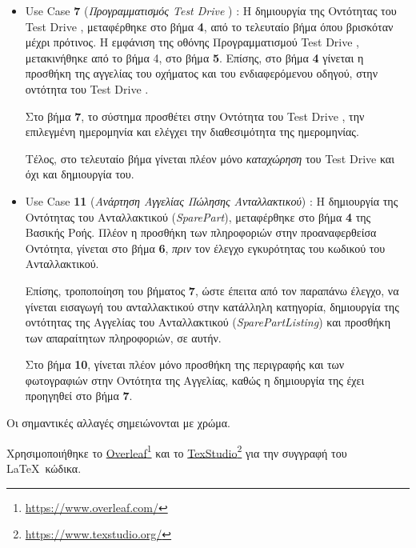 \documentclass{../ol-softwaremanual}
\newcommand{\doclink}[2]{\href{#1}{#2}\footnote{\url{#1}}}
\begin{document}
\begin{itemize}
		\item \en Use Case \textbf{7} \gr (\textit{Προγραμματισμός \en Test Drive \gr}) : Η δημιουργία της Οντότητας του \en Test Drive \gr, μεταφέρθηκε στο βήμα \textbf{4}, από το τελευταίο βήμα όπου βρισκόταν μέχρι πρότινος. Η εμφάνιση της οθόνης Προγραμματισμού \en Test Drive \gr, μετακινήθηκε από το βήμα 4, στο βήμα \textbf{5}. Επίσης, στο βήμα \textbf{4} γίνεται η προσθήκη της αγγελίας του οχήματος και του ενδιαφερόμενου οδηγού, στην οντότητα του \en Test Drive \gr.
		
		Στο βήμα \textbf{7}, το σύστημα προσθέτει στην Οντότητα του \en Test Drive \gr, την επιλεγμένη ημερομηνία και ελέγχει την διαθεσιμότητα της ημερομηνίας.
		
		Τέλος, στο τελευταίο βήμα γίνεται πλέον μόνο \textit{καταχώρηση} του \en Test Drive \gr και όχι και δημιουργία του.
		
		
		\item \en Use Case \textbf{11} \gr (\textit{Ανάρτηση Αγγελίας Πώλησης Ανταλλακτικού}) : Η δημιουργία της Οντότητας του Ανταλλακτικού (\en \textit{SparePart}\gr), μεταφέρθηκε στο βήμα \textbf{4} της Βασικής Ροής. Πλέον η προσθήκη των πληροφοριών στην προαναφερθείσα Οντότητα, γίνεται στο βήμα \textbf{6}, \textit{πριν} τον έλεγχο εγκυρότητας του κωδικού του Ανταλλακτικού.
		
		Επίσης, τροποποίηση του βήματος \textbf{7}, ώστε έπειτα από τον παραπάνω έλεγχο, να γίνεται εισαγωγή του ανταλλακτικού στην κατάλληλη κατηγορία, δημιουργία της οντότητας της Αγγελίας του Ανταλλακτικού (\en \textit{SparePartListing}\gr) και προσθήκη των απαραίτητων πληροφοριών, σε αυτήν.
		
		Στο βήμα \textbf{10}, γίνεται πλέον μόνο προσθήκη της περιγραφής και των φωτογραφιών στην Οντότητα της Αγγελίας, καθώς η δημιουργία της έχει προηγηθεί στο βήμα \textbf{7}.
		
	\end{itemize}
	
	
	\vspace{20pt}
	
	Οι σημαντικές αλλαγές σημειώνονται με  χρώμα.
	
	
	
	
	\newpage 
	
	\vspace{20pt}
	\flushleft
	Χρησιμοποιήθηκε το \en \doclink{https://www.overleaf.com/}{Overleaf} \gr και το \en \doclink{https://www.texstudio.org/}{TexStudio} \gr για την συγγραφή του \LaTeX\ κώδικα. \break
	
\end{document}
